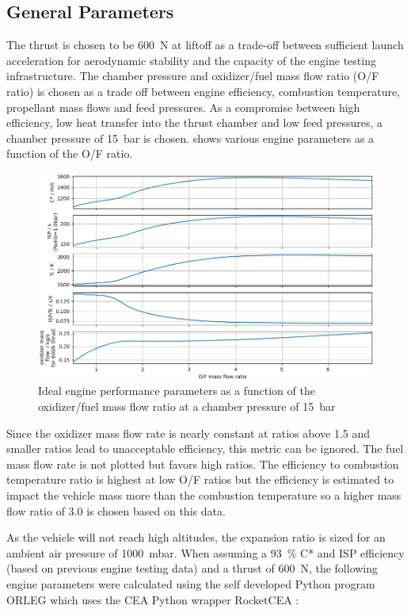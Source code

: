\subsection{General Parameters}

The thrust is chosen to be \SI{600}{\newton} at liftoff as a trade-off between sufficient launch acceleration for aerodynamic stability and the capacity of the engine testing infrastructure. The chamber pressure and oxidizer/fuel mass flow ratio (O/F ratio) is chosen as a trade off between engine efficiency, combustion temperature, propellant mass flows and feed pressures.
As a compromise between high efficiency, low heat transfer into the thrust chamber and low feed pressures, a chamber pressure of \SI{15}{\bar} is chosen.  shows various engine parameters as a function of the O/F ratio.

\begin{figure}[H]
\centering
\includegraphics[width=\textwidth]{Propulsion/engineParameters.png}
\caption{Ideal engine performance parameters as a function of the oxidizer/fuel mass flow ratio at a chamber pressure of \SI{15}{\bar}}
\label{fig:sysarch_engPerf}
\end{figure}

Since the oxidizer mass flow rate is nearly constant at ratios above 1.5 and smaller ratios lead to unacceptable efficiency, this metric can be ignored. The fuel mass flow rate is not plotted but favors high ratios. The efficiency to combustion temperature ratio is highest at low O/F ratios but the efficiency is estimated to impact the vehicle mass more than the combustion temperature so a higher mass flow ratio of 3.0 is chosen based on this data.

As the vehicle will not reach high altitudes, the expansion ratio is sized for an ambient air pressure of \SI{1000}{\milli\bar}.
When assuming a \SI{93}{\percent} C* and ISP efficiency (based on previous engine testing data) and a thrust of \SI{600}{\newton}, the following engine parameters were calculated using the self developed Python program ORLEG \cite{orleg} which uses the CEA \cite{CEA} Python wrapper RocketCEA \cite{RocketCEA}:

